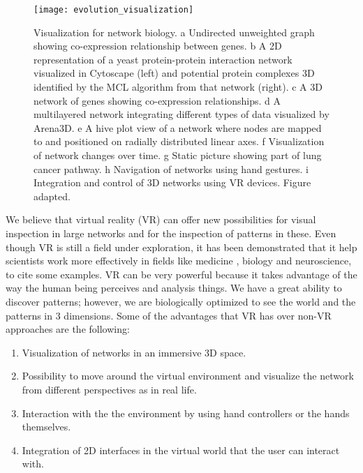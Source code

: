 \begin{figure}[h!]
    \newlength{\tempheight}
    \setlength{\tempheight}{15ex}
    \centering%
    \texttt{[image: evolution\_visualization]}
    \caption{Visualization for network biology. a Undirected unweighted graph showing co-expression relationship between genes. b A 2D representation of a yeast protein-protein interaction network visualized in Cytoscape (left) and potential protein complexes 3D identified by the MCL algorithm from that network (right). c A 3D network of genes showing co-expression relationships. d A multilayered network integrating different types of data visualized by Arena3D. e A hive plot view of a network where nodes are mapped to and positioned on radially distributed linear axes. f Visualization of network changes over time. g Static picture showing part of lung cancer pathway. h Navigation of networks using hand gestures. i Integration and control of 3D networks using VR devices. Figure adapted\cite{pavlopoulos_malliarakis_papanikolaou_theodosiou_enright_iliopoulos_2015}.}
    \label{fig:network_biology_evolution}
\end{figure}%

We believe that virtual reality (VR) can offer new possibilities for visual inspection in large networks and for the inspection of patterns in these. Even though VR is still a field under exploration, it has been demonstrated that it help scientists work more effectively in fields like medicine \cite{Laver11}\cite{xia_ip_samman_wong_gateno_wang_yeung_kot_tideman_2001}\cite{brain_damage_rehab}, biology\cite{10.1093/bioinformatics/bti581}\cite{thorley_lawson_duca_shapiro_2008} and neuroscience\cite{bohil_alicea_biocca_2011}\cite{minderer_harvey_donato_moser_2016}, to  cite some examples. VR can be very powerful because it takes advantage of the way the human being perceives and analysis things. We have a great ability to discover patterns; however, we are biologically optimized to see the world and the patterns in 3 dimensions. Some of the advantages that VR has over non-VR approaches are the following:

\begin{enumerate}
  \item Visualization of networks in an immersive 3D space.
  \item Possibility to move around the virtual environment and visualize the network from different perspectives as in real life.
  \item Interaction with the the environment by using hand controllers or the hands themselves.
  \item Integration of 2D interfaces in the virtual world that the user can interact with.
\end{enumerate}

